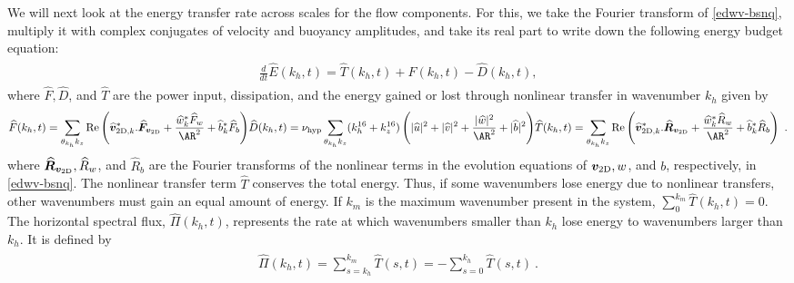 \documentclass[../Rajarshi-thesis-draft.tex]{subfiles}
\begin{document}
We will next look at the energy transfer rate across scales for the flow components. For this, we take the Fourier transform of \eqref{edwv-bsnq}, multiply it with complex conjugates of velocity and buoyancy amplitudes, and take its real part to write down the following energy budget equation:
\begin{align}
\label{edwv-spebg}
\begin{split}
\frac{d }{dt}\hat{E}(k_h, t) = \hat{T}(k_h, t) + \hat{F}(k_h, t) - \hat{D}(k_h, t) ,
\end{split}
\end{align}
where $\hat{F}, \hat{D}$, and $\hat{T}$ are the power input, dissipation, and the energy gained or lost through nonlinear transfer in wavenumber $k_h$ given by 
\begin{subequations}
\begin{align}
\begin{split} 
    \hat{F}(k_h, t) = \sum\limits_{\theta_{k_h}k_z} \op{Re}\left(\hat{\vec{v}}_{{\rm 2D},k}^*.\hat{\vec{F}}_{\vec{v}_{\rm 2D}} + \frac{\hat{w}_k^*\hat{F}_w}{\AR^2} + \hat{b}_k^*\hat{F}_b\right)
\end{split}
\end{align}
\begin{align}
\begin{split}
    \hat{D}(k_h, t) = \nu_{\rm hyp}\sum\limits_{\theta_{k_h}k_z} (k_h^{16} + k_z^{16})\left( |\hat{u}|^2 + |\hat{v}|^2 + \frac{|\hat{w}|^2}{\AR^2}+ |\hat{b}|^2\right)
\end{split}
\end{align}
\begin{align}
\begin{split}
    \hat{T}(k_h, t) = \sum\limits_{\theta_{k_h}k_z} \op{Re}\left( \hat{\vec{v}}_{{\rm 2D},k}^* . \hat{\vec{R}}_{\vec{v}_{\rm 2D}} + \frac{\hat{w}_k^*\hat{R}_w}{\AR^2} + \hat{b}_k^*\hat{R}_b \right) \ .
\end{split}
\end{align}
\end{subequations}
where $\hat{\vec{R}}_{\vec{v}_{\rm 2D}}, \hat{R}_w$, and $\hat{R}_b$ are the Fourier transforms of the nonlinear terms in the evolution equations of $\vec{v}_{\rm 2D}, w$, and $b$, respectively, in \eqref{edwv-bsnq}. The nonlinear transfer term $\hat{T}$ conserves the total energy. Thus, if some wavenumbers lose energy due to nonlinear transfers, other wavenumbers must gain an equal amount of energy. If $k_m$ is the maximum wavenumber present in the system, $\sum_{0}^{k_m} \hat{T}(k_h, t) = 0$. The horizontal spectral flux, $\hat{\Pi}(k_h, t)$, represents the rate at which wavenumbers smaller than $k_h$ lose energy to wavenumbers larger than $k_h$. It is defined by
\begin{align}
\begin{split}
\label{edwv-fxe}
\hat{\Pi}(k_h, t) = \sum\limits_{s=k_h}^{k_m} \hat{T}(s, t) = - \sum\limits_{s=0}^{k_h} \hat{T}(s, t) \ .
\end{split}
\end{align}
\end{document}
